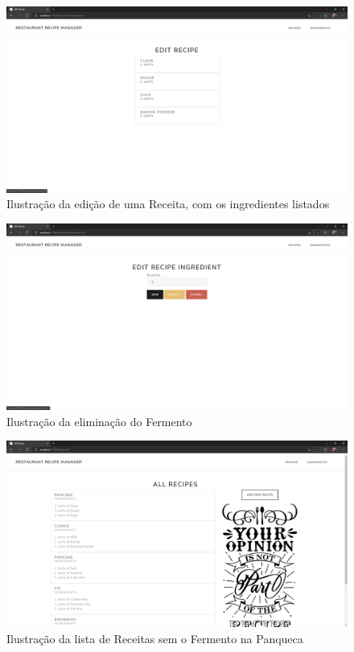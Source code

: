 \FloatBarrier
\begin{figure}[!hbt]
    \centering
    \includegraphics[width=14cm]{Resources/WebApp/Recipes/recipe (10).png}
    \caption{Ilustração da edição de uma Receita, com os ingredientes listados}
    \label{fig:app_rec_10}
\end{figure}
\FloatBarrier
\begin{figure}[!hbt]
    \centering
    \includegraphics[width=14cm]{Resources/WebApp/Recipes/recipe (11).png}
    \caption{Ilustração da eliminação do Fermento}
    \label{fig:app_rec_11}
\end{figure}
\FloatBarrier
\begin{figure}[!hbt]
    \centering
    \includegraphics[width=14cm]{Resources/WebApp/Recipes/recipe (12).png}
    \caption{Ilustração da lista de Receitas sem o Fermento na Panqueca}
    \label{fig:app_rec_12}
\end{figure}
